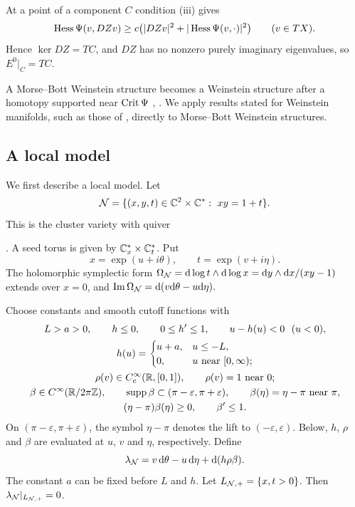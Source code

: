 \documentclass[12pt, letter]{amsart}
\theoremstyle{definition}
\begin{document}
At a point of a component $C$ condition (iii) gives
\[
 \operatorname{Hess}\Psi(v,DZv)\ge c\bigl(|DZv|^2+|\operatorname{Hess}\Psi(v,\cdot)|^2\bigr)\qquad(v\in TX).
\]
Hence $\ker DZ=TC$, and $DZ$ has no nonzero purely imaginary eigenvalues, so $E^0|_C=TC$.

A Morse--Bott Weinstein structure becomes a Weinstein structure after a homotopy supported near $\operatorname{Crit}\Psi$ \cite[Lemma~2.18]{AGEN}, \cite[Proposition~2.7]{St}.
We apply results stated for Weinstein manifolds, such as those of \cite{GPS2}, directly to Morse--Bott Weinstein structures.




\subsection{A local model}\label{sec:local-models}

We first describe a local model.\label{sec:node-model}
Let
\[
 \cN=\{(x,y,t)\in\bC^2\times\bC^*:\ xy=1+t\}.
\]
This is  the cluster variety with quiver 
. A seed torus is given by \(\mathbb{C}^*_x \times \mathbb{C}^*_t\). Put 
\[
x = \exp( u + i\theta), \qquad t = \exp( v + i\eta).  
\]
The holomorphic symplectic form $\Omega_{\mathcal{N}}=\mathrm{d}\log t\wedge \mathrm{d}\log x=\mathrm{d} y\wedge \mathrm{d} x/(xy-1)$ extends over $x=0$, and
\(
 \operatorname{Im}\Omega_{\mathcal{N}}= 
 \mathrm{d}(v \mathrm{d}\theta - u \mathrm{d} \eta).
\)

Choose constants and smooth cutoff functions with
\[
 \begin{gathered}
 L>a>0,\qquad h\le0,\qquad 0\le h'\le1,\qquad u-h(u)<0\ \ (u<0),\\
 h(u)=\begin{cases}u+a,&u\le-L,\\ 0,&u\text{ near }[0,\infty);\end{cases}\\
 \rho(v)\in C_c^\infty(\bR,[0,1]),\qquad
 \rho(v)=1\text{ near }0;\\
 \beta\in C^\infty(\bR/2\pi\bZ),\qquad\supp\beta\subset(\pi-\varepsilon,\pi+\varepsilon),\qquad
 \beta(\eta)=\eta-\pi\text{ near }\pi, \\ (\eta-\pi)\beta(\eta)\ge0,\qquad\beta'\le1 .
 \end{gathered}
\]
On $(\pi-\varepsilon,\pi+\varepsilon)$, the symbol $\eta-\pi$ denotes the lift to $(-\varepsilon,\varepsilon)$.
Below, $h$, $\rho$ and $\beta$ are evaluated at $u$, $v$ and $\eta$, respectively.
Define
\begin{equation}\label{eq:node-primitive}
 \lambda_{\mathcal{N}}=v\,\mathrm{d}\theta-u\,\mathrm{d}\eta+\mathrm{d}(h\rho\beta).
\end{equation}
The constant $a$ can be fixed before $L$ and $h$. Let \( L_{\mathcal{N}, +} = \{ x, t > 0 \}\). Then \( \lambda_{\mathcal{N}}|_{L_{\mathcal{N},+}} = 0\). 
\end{document}
